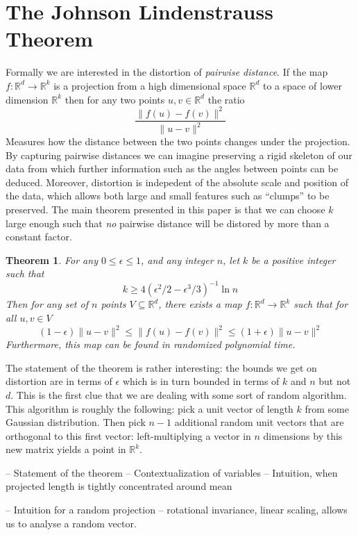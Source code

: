 \documentclass[11pt]{article}
\newcommand{\arr}{\rightarrow}
\newcommand{\R}{\mathbb{R}}
\newtheorem{Thm}{Theorem}
\begin{document}
\section{The Johnson Lindenstrauss Theorem}
Formally we are interested in the distortion of \textit{pairwise distance}. If the map $f : \R^d \arr \R^k$ is a projection from a high dimensional space $\R^d$ to a space of lower dimension $\R^k$ then for any two points $u, v \in \R^d$ the ratio
\[ \frac{\| f(u) - f(v) \|^2}{\| u - v \|^2} \]
Measures how the distance between the two points changes under the projection. By capturing pairwise distances we can imagine preserving a rigid skeleton of our data from which further information such as the angles between points can be deduced. Moreover, distortion is indepedent of the absolute scale and position of the data, which allows both large and small features such as ``clumps'' to be preserved. The main theorem presented in this paper \cite{mainpaper} is that we can choose $k$ large enough such that \textit{no} pairwise distance will be distored by more than a constant factor.

\begin{Thm}

  For any $0 \leq \epsilon \leq 1$, and any integer $n$, let $k$ be a positive
  integer such that
  \[ 
    k \geq 4(\epsilon^2/2 - \epsilon^3/3)^{-1} \ln n 
  \]
  Then for any set of $n$ points $V \subseteq \R^d$, there exists a map
  $f:\R^d \arr \R^k$ such that for all $u, v \in V$
  \[
    (1-\epsilon)\|u - v\|^2 \leq \| f(u) - f(v) \|^2 \leq (1+\epsilon) \| u - v \|^2 
  \]
  Furthermore, this map can be found in randomized polynomial time.

\end{Thm}

The statement of the theorem is rather interesting: the bounds we get on
distortion are in terms of $\epsilon$ which is in turn bounded in terms of $k$
and $n$ but not $d$. This is the first clue that we are dealing with some sort
of random algorithm. This algorithm is roughly the following: pick a unit vector
of length $k$ from some Gaussian distribution. Then pick $n-1$ additional random
unit vectors that are orthogonal to this first vector: left-multiplying a vector
in $n$ dimensions by this new matrix yields a point in $\mathbb{R}^k$.

-- Statement of the theorem
-- Contextualization of variables
-- Intuition, when projected length is tightly concentrated around mean

-- Intuition for a random projection
-- rotational invariance, linear scaling, allows us to analyse a random vector.
\end{document}
